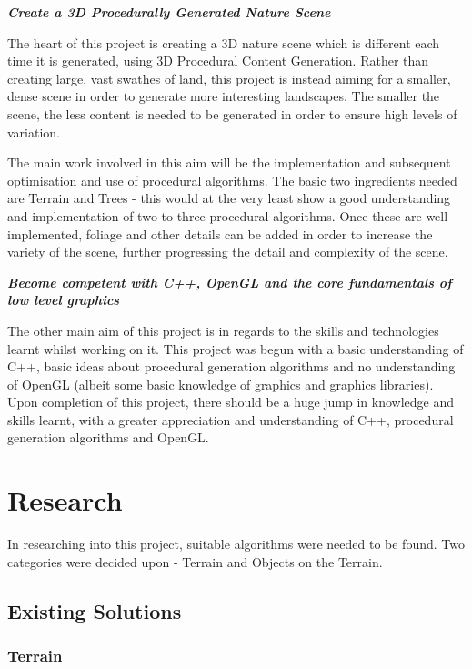 \documentclass[a4paper,10pt]{report}
\begin{document}
\textbf{\textit{Create a 3D Procedurally Generated Nature Scene}} \medskip

The heart of this project is creating a 3D nature scene which is different each time it is generated, using 3D Procedural Content Generation. Rather than creating large, vast swathes of land, this project is instead aiming for a smaller, dense scene in order to generate more interesting landscapes. The smaller the scene, the less content is needed to be generated in order to ensure high levels of variation.\medskip

The main work involved in this aim will be the implementation and subsequent optimisation and use of procedural algorithms. The basic two ingredients needed are Terrain and Trees - this would at the very least show a good understanding and implementation of two to three procedural algorithms. Once these are well implemented, foliage and other details can be added in order to increase the variety of the scene, further progressing the detail and complexity of the scene.  \medskip


\textbf{\textit{Become competent with C++, OpenGL and the core fundamentals of low level graphics}} \medskip

The other main aim of this project is in regards to the skills and technologies learnt whilst working on it. This project was begun with a basic understanding of C++, basic ideas about procedural generation algorithms and no understanding of OpenGL (albeit some basic knowledge of graphics and graphics libraries). Upon completion of this project, there should be a huge jump in knowledge and skills learnt, with a greater appreciation and understanding of C++, procedural generation algorithms and OpenGL.\medskip

\chapter{Research}

In researching into this project, suitable algorithms were needed to be found. Two categories were decided upon - Terrain and Objects on the Terrain. \medskip

\section{Existing Solutions}

\subsection{Terrain}
\end{document}
